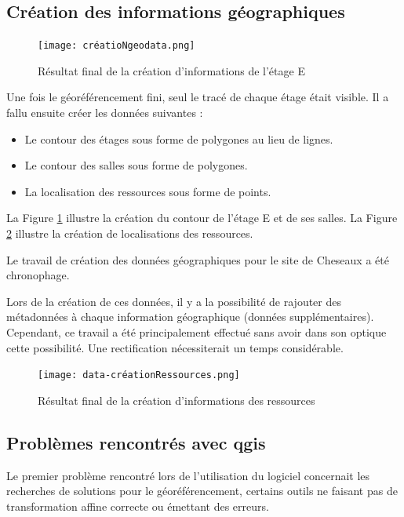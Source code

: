 \documentclass[
    iai, %
    il, %
]{heig-tb}
\begin{document}
\subsection{Création des informations géographiques}

\begin{figure}[h]
    \centering
    \texttt{[image: créatioNgeodata.png]}
    \caption{Résultat final de la création d'informations de l'étage E}
    \label{fig:polygones}
\end{figure}

Une fois le géoréférencement fini, seul le tracé de chaque étage était visible.
Il a fallu ensuite créer les données suivantes :

\begin{itemize}
    \item Le contour des étages sous forme de polygones au lieu de lignes.
    \item Le contour des salles sous forme de polygones.
    \item La localisation des ressources sous forme de points.
\end{itemize}

La Figure \ref{fig:polygones} illustre la création du contour de l'étage E et de ses salles.
La Figure \ref{fig:ressources} illustre la création de localisations des ressources.

Le travail de création des données géographiques pour le site de Cheseaux a été chronophage.

Lors de la création de ces données, il y a la possibilité de rajouter des métadonnées à chaque information géographique
(données supplémentaires). Cependant, ce travail a été principalement effectué sans avoir dans son optique cette possibilité.
Une rectification nécessiterait un temps considérable.


\begin{figure}[h]
    \centering
    \texttt{[image: data-créationRessources.png]}
    \caption{Résultat final de la création d'informations des ressources}
    \label{fig:ressources}
\end{figure}

\subsection{Problèmes rencontrés avec \gls{qgis}}
Le premier problème rencontré lors de l'utilisation du logiciel concernait les recherches de solutions pour le géoréférencement,
certains outils ne faisant pas de transformation affine correcte ou émettant des erreurs.
\end{document}
